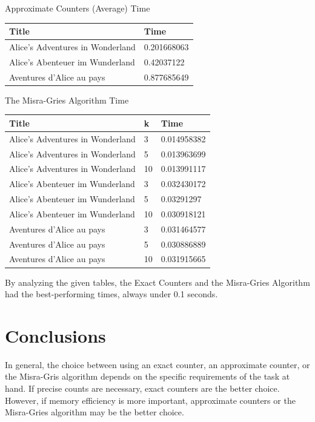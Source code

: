 \documentclass[]{revdetua}
\begin{document}
\begin{table}[!ht]
    \centering
    Approximate Counters (Average) Time
    \begin{tabular}{|l|l|}
    \hline
        Title & Time \\ \hline
        Alice’s Adventures in Wonderland & 0.201668063 \\ \hline
        Alice's Abenteuer im Wunderland & 0.42037122 \\ \hline
        Aventures d'Alice au pays & 0.877685649 \\ \hline
    \end{tabular}
\end{table}

\begin{table}[!ht]
    \centering
    The Misra-Gries Algorithm Time
    \begin{tabular}{|l|l|l|}
    \hline
        Title & k & Time \\ \hline
        Alice’s Adventures in Wonderland & 3 & 0.014958382 \\ \hline
        Alice’s Adventures in Wonderland & 5 & 0.013963699 \\ \hline
        Alice’s Adventures in Wonderland & 10 & 0.013991117 \\ \hline
        Alice's Abenteuer im Wunderland & 3 & 0.032430172 \\ \hline
        Alice's Abenteuer im Wunderland & 5 & 0.03291297 \\ \hline
        Alice's Abenteuer im Wunderland & 10 & 0.030918121 \\ \hline
        Aventures d'Alice au pays & 3 & 0.031464577 \\ \hline
        Aventures d'Alice au pays & 5 & 0.030886889 \\ \hline
        Aventures d'Alice au pays & 10 & 0.031915665 \\ \hline
    \end{tabular}
\end{table}

By analyzing the given tables, the Exact Counters and the Misra-Gries Algorithm had the best-performing times, always under 0.1 seconds.

\section{Conclusions}

In general, the choice between using an exact counter, an approximate counter, or the Misra-Gris algorithm depends on the specific requirements of the task at hand. If precise counts are necessary, exact counters are the better choice. However, if memory efficiency is more important, approximate counters or the Misra-Gries algorithm may be the better choice. 
\end{document}
